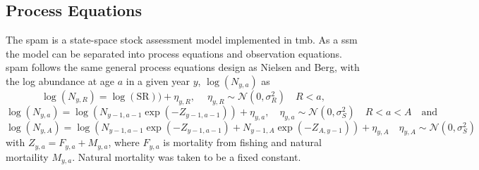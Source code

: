 \documentclass[11pt]{article}\usepackage[]{graphicx}\usepackage[]{color}
\begin{document}
\subsection{Process Equations}
The \acrfull{spam} is a state-space stock assessment model implemented in \acrfull{tmb}. As a \acrfull{ssm} the model can be separated into process equations and observation equations. \acrshort{spam} follows the same general process equations design as Nielsen and Berg\cite{Nielsen2014Estimation-of-t}, with the log abundance at age $a$ in a given year $y$, $\log(N_{y,a})$ as 
\begin{equation}\label{Nrec}
\log(N_{y,R}) = \log(\text{SR})) + \eta_{y,R}, \quad \ \eta_{y,R} \sim \mathcal{N}(0,\sigma_R^2) \quad R < a ,
\end{equation}
\begin{equation}\label{Nsur}
\log(N_{y,a}) = \log(N_{y-1,a-1}\exp(-Z_{y-1,a-1})) + \eta_{y,a}, \quad \eta_{y,a} \sim \mathcal{N}(0,\sigma_S^2) \quad R < a < A \quad \text{and}
\end{equation}
\begin{equation}\label{Nplus}
\log(N_{y,A}) = \log(N_{y-1,a-1}\exp(-Z_{y-1,a-1})+N_{y-1,A}\exp(-Z_{A,y-1})) + \eta_{y,A} \quad \eta_{y,A} \sim \mathcal{N}(0,\sigma^2_S)
\end{equation}
with $Z_{y,a} = F_{y,a} + M_{y,a}$, where $F_{y,a}$ is mortality from fishing and natural mortaility $M_{y,a}$. Natural mortality was taken to be a fixed constant.
\end{document}
